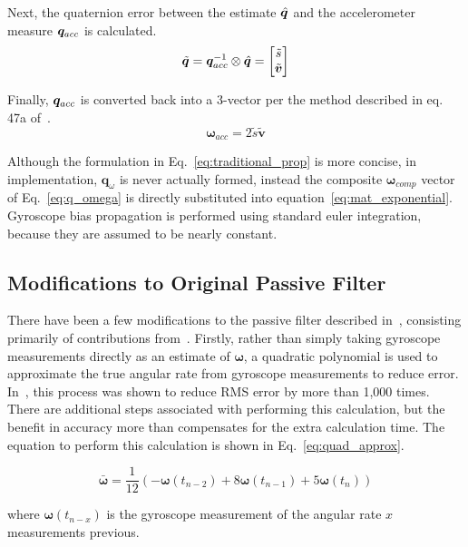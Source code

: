 \documentclass[paper=a4, fontsize=11pt]{scrartcl} %
\numberwithin{equation}{section} %
\numberwithin{figure}{section} %
\numberwithin{table}{section} %
\begin{document}
\newcommand{\qtilde}{\tilde{\bm{q}}}
\newcommand{\vtilde}{\tilde{\bm{v}}}
Next, the quaternion error between the estimate $\hat{\bm{q}}$ and the accelerometer measure $\bm{q}_{acc}$ is calculated.
\begin{equation}
	\qtilde = \qmeas^{-1} \otimes \qhat =
		\begin{bmatrix}
			\tilde{s}\\
			\vtilde
		\end{bmatrix}
\end{equation}

\newcommand{\wmeas}{\bm{\omega}_{acc}}
Finally, $\bm{q}_{acc}$ is converted back into a 3-vector per the method described in eq. 47a of~\cite{Mahony2007}.
\begin{equation}
	\wmeas = 2\tilde{s}\vtilde
\end{equation}

Although the formulation in Eq.~\ref{eq:traditional_prop} is more concise, in implementation, $\bm{q}_{\omega}$ is never actually formed, instead the composite $\bm{\omega}_{comp}$ vector of Eq.~\ref{eq:q_omega} is directly substituted into equation~\ref{eq:mat_exponential}.  Gyroscope bias propagation is performed using standard euler integration, because they are assumed to be nearly constant.

\subsection{Modifications to Original Passive Filter}
There have been a few modifications to the passive filter described in~\cite{Mahony2007}, consisting primarily of contributions from~\cite{Casey2013}.  Firstly, rather than simply taking gyroscope measurements directly as an estimate of $\bm{\omega}$, a quadratic polynomial is used to approximate the true angular rate from gyroscope measurements to reduce error.  In~\cite{Casey2013}, this process was shown to reduce RMS error by more than 1,000 times.  There are additional steps associated with performing this calculation, but the benefit in accuracy more than compensates for the extra calculation time.  The equation to perform this calculation is shown in Eq.~\ref{eq:quad_approx}.

\begin{equation}
	\bar{\bm{\omega}} = \frac{1}{12}\left(-\bm{\omega}\left(t_{n-2}\right) + 8\bm{\omega}\left(t_{n-1}\right) + 5\bm{\omega}\left(t_n\right) \right)
	\label{eq:quad_approx}
\end{equation}

where $\bm{\omega}(t_{n-x})$ is the gyroscope measurement of the angular rate $x$ measurements previous.
\end{document}
